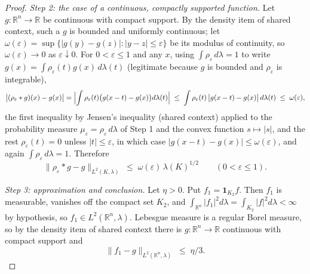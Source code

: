 \begin{proof}
\emph{Step 2: the case of a continuous, compactly supported function.}
Let $g : \mathbb{R}^n \to \mathbb{R}$ be continuous with compact support.  By the
density item of shared context, such a $g$ is bounded and uniformly continuous;
let $\omega(\varepsilon) = \sup\{|g(y)-g(z)| : |y-z| \leq \varepsilon\}$ be its
modulus of continuity, so $\omega(\varepsilon) \to 0$ as $\varepsilon \downarrow 0$.
For $0 < \varepsilon \leq 1$ and any $x$, using
$\int\rho_\varepsilon \, d\lambda = 1$ to write
$g(x) = \int \rho_\varepsilon(t) g(x)\, d\lambda(t)$ (legitimate because $g$ is
bounded and $\rho_\varepsilon$ is integrable),
\[
  \bigl|(\rho_\varepsilon * g)(x) - g(x)\bigr|
    = \Bigl|\int \rho_\varepsilon(t)\bigl(g(x-t)-g(x)\bigr) d\lambda(t)\Bigr|
    \;\leq\; \int \rho_\varepsilon(t)\,\bigl|g(x-t)-g(x)\bigr|\, d\lambda(t)
    \;\leq\; \omega(\varepsilon) ,
\]
the first inequality by Jensen's inequality (shared context) applied to the
probability measure $\mu_\varepsilon = \rho_\varepsilon\,d\lambda$ of Step 1 and
the convex function $s \mapsto |s|$, and the rest $\rho_\varepsilon(t) = 0$ unless $|t| \leq \varepsilon$, in which case
$|g(x-t)-g(x)| \leq \omega(\varepsilon)$, and again
$\int\rho_\varepsilon\,d\lambda = 1$.  Therefore
\begin{equation*}
  \|\rho_\varepsilon * g - g\|_{L^2(K,\lambda)}
    \;\leq\; \omega(\varepsilon)\, \lambda(K)^{1/2}
  \qquad (0 < \varepsilon \leq 1).
  \tag{2}
\end{equation*}

\emph{Step 3: approximation and conclusion.}
Let $\eta > 0$.  Put $f_1 = \mathbf{1}_{K_2} f$.  Then $f_1$ is measurable,
vanishes off the compact set $K_2$, and
$\int_{\mathbb{R}^n}|f_1|^2 d\lambda = \int_{K_2}|f|^2 d\lambda < \infty$ by
hypothesis, so $f_1 \in L^2(\mathbb{R}^n,\lambda)$.  Lebesgue measure is a regular
Borel measure, so by the density item of shared context there is
$g : \mathbb{R}^n \to \mathbb{R}$ continuous with compact support and
\begin{equation*}
  \|f_1 - g\|_{L^2(\mathbb{R}^n,\lambda)} \;\leq\; \eta/3 .
  \tag{3}
\end{equation*}


\end{proof}
